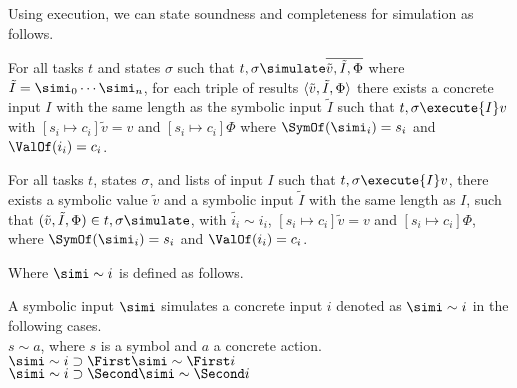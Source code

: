 Using execution, we can state soundness and completeness for simulation as follows.

\begin{lemma}
  \label{lem:soundsimulate}
  For all tasks $t$ and states $\sigma$
  such that $t,\sigma\simulate\overline{\tilde{v},\tilde{I},\Phi}$
  where $\tilde{I} = \simi_0 \cdots \simi_n$,
  for each triple of results $\langle\tilde{v},\tilde{I},\Phi\rangle$
  there exists a concrete input $I$ with the same length as the symbolic input $\tilde{I}$
  such that $t,\sigma\execute{I}v$
  with $[s_i\mapsto c_i]\tilde{v}=v$ and $[s_i\mapsto c_i]\Phi$
  where $\SymOf(\simi_i)=s_i$ and $\ValOf(i_i)=c_i$.
\end{lemma}

\begin{lemma}
  \label{lem:completesimulate}
  For all tasks $t$, states $\sigma$, and lists of input $I$
  such that $t,\sigma\execute{I}v$,
  there exists a symbolic value $\tilde{v}$ and a symbolic input $\tilde{I}$ with the same length as $I$,
  such that $(\tilde{v},\tilde{I},\Phi)\in t,\sigma\simulate$,
  with $\tilde{i_i}\sim i_i$, $[s_i\mapsto c_i]\tilde{v}=v$ and $[s_i\mapsto c_i]\Phi$,
  where $\SymOf(\simi_i)=s_i$ and $\ValOf(i_i)=c_i$.
\end{lemma}

Where $\simi\sim i$ is defined as follows.

\begin{definition}
  A symbolic input $\simi$ simulates a concrete input $i$ denoted as $\simi\sim i$ in the following cases.\\
  $s\sim a$, where $s$ is a symbol and $a$ a concrete action.\\
  $\simi\sim i\implies \First \simi \sim \First i$\\
  $\simi\sim i\implies \Second \simi \sim \Second i$
\end{definition}

